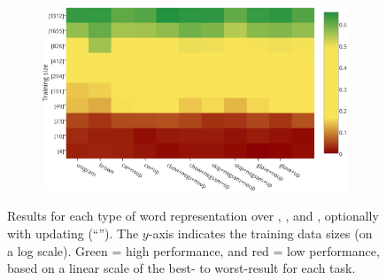 \begin{figure}[t!]
\begin{subfigure}{7cm}
	\subcaption{\ner (\fscore)}	
	\label{ner}
\end{subfigure}
\begin{subfigure}{7cm}
	\centering
    \includegraphics[scale=0.4]{plots/map-mwe-color-invert}
	\subcaption{\mwe (\fscore)}		
	\label{mwe}
\end{subfigure}
\caption{Results for each type of word representation over \pos, \chunking, \ner and
  \mwe, optionally with updating (``\withup''). The $y$-axis indicates the training data
  sizes (on a log scale). Green = high performance, and red = low
  performance, based on a linear scale of the best- to worst-result for
  each task. }
\label{fig:heatmaps}
\end{figure}

